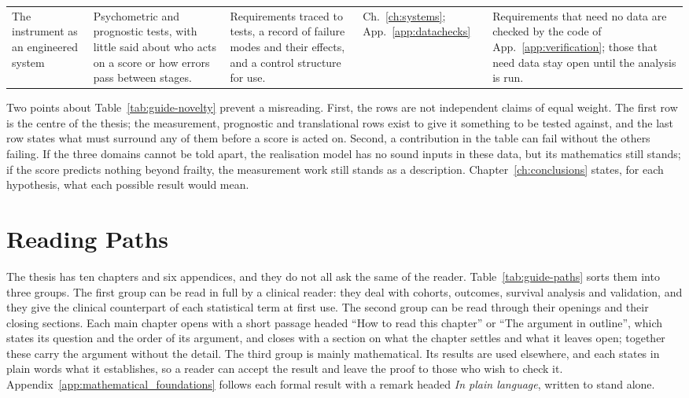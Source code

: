 \begin{longtable}{>{\raggedright\arraybackslash}p{2.4cm} >{\raggedright\arraybackslash}p{3.0cm} >{\raggedright\arraybackslash}p{3.6cm} >{\raggedright\arraybackslash}p{1.4cm} >{\raggedright\arraybackslash}p{3.7cm}}
\addlinespace
The instrument as an engineered system & Psychometric and prognostic tests, with little said about who acts on a score or how errors pass between stages. & Requirements traced to tests, a record of failure modes and their effects, and a control structure for use. & Ch.~\ref{ch:systems}; App.~\ref{app:datachecks} & Requirements that need no data are checked by the code of App.~\ref{app:verification}; those that need data stay open until the analysis is run. \\
\end{longtable}
\endgroup

Two points about Table~\ref{tab:guide-novelty} prevent a misreading. First,
the rows are not independent claims of equal weight. The first row is the
centre of the thesis; the measurement, prognostic and translational rows exist
to give it something to be tested against, and the last row states what must
surround any of them before a score is acted on. Second, a contribution in the
table can fail without the others failing. If the three domains cannot be told
apart, the realisation model has no sound inputs in these data, but its
mathematics still stands; if the score predicts nothing beyond frailty, the
measurement work still stands as a description. Chapter~\ref{ch:conclusions}
states, for each hypothesis, what each possible result would mean.

\section*{Reading Paths}
\label{sec:guide-paths}

The thesis has ten chapters and six appendices, and they do not all ask the
same of the reader. Table~\ref{tab:guide-paths} sorts them into three groups.
The first group can be read in full by a clinical reader: they deal with
cohorts, outcomes, survival analysis and validation, and they give the
clinical counterpart of each statistical term at first use. The second group
can be read through their openings and their closing sections. Each main
chapter opens with a short passage headed ``How to read this chapter'' or
``The argument in outline'', which states its question and the order of its
argument, and closes with a section on what the chapter settles and what it
leaves open; together these carry the argument without the detail. The third
group is mainly mathematical. Its results are used elsewhere, and each states
in plain words what it establishes, so a reader can accept the result and
leave the proof to those who wish to check it. Appendix~\ref{app:mathematical_foundations}
follows each formal result with a remark headed \emph{In plain language},
written to stand alone.

